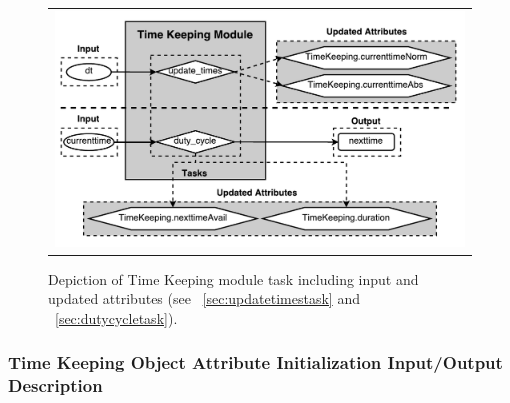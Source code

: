\documentclass[cleanfoot]{asme2ej}
\begin{document}
\begin{figure}[ht]
    \begin{center}
        \begin{tabular}{c}
             \includegraphics[width=\textwidth]{TimeKeepingTasks}
        \end{tabular}
    \end{center}
    \caption{\label{fig:timekeepingmodule} Depiction of Time Keeping module task including input and updated attributes (see ~\ref{sec:updatetimestask} and ~\ref{sec:dutycycletask}).}
\end{figure}

\subsubsection{Time Keeping Object Attribute Initialization Input/Output Description}
\end{document}
